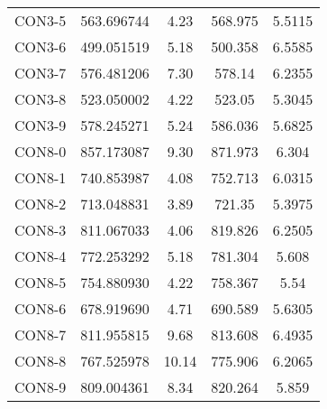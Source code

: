 \begin{table}[ht]
\begin{tabular}{c c c c c}
CON3-5 & 563.696744 & 4.23 & 568.975 & 5.5115 \\
CON3-6 & 499.051519 & 5.18 & 500.358 & 6.5585 \\
CON3-7 & 576.481206 & 7.30 & 578.14 & 6.2355 \\
CON3-8 & 523.050002 & 4.22 & 523.05 & 5.3045 \\
CON3-9 & 578.245271 & 5.24 & 586.036 & 5.6825 \\
CON8-0 & 857.173087 & 9.30 & 871.973 & 6.304 \\
CON8-1 & 740.853987 & 4.08 & 752.713 & 6.0315 \\
CON8-2 & 713.048831 & 3.89 & 721.35 & 5.3975 \\
CON8-3 & 811.067033 & 4.06 & 819.826 & 6.2505 \\
CON8-4 & 772.253292 & 5.18 & 781.304 & 5.608 \\
CON8-5 & 754.880930 & 4.22 & 758.367 & 5.54 \\
CON8-6 & 678.919690 & 4.71 & 690.589 & 5.6305 \\
CON8-7 & 811.955815 & 9.68 & 813.608 & 6.4935 \\
CON8-8 & 767.525978 & 10.14 & 775.906 & 6.2065 \\
CON8-9 & 809.004361 & 8.34 & 820.264 & 5.859 \\
[1ex]\hline
\end{tabular}
\label{table:nonlin}
\end{table} \clearpage
